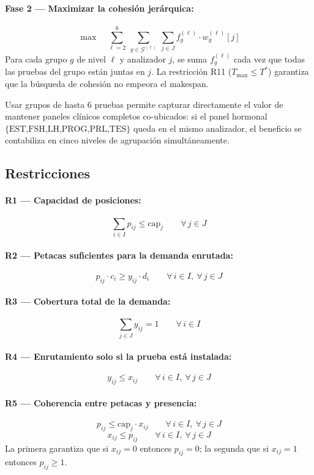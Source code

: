 \documentclass[12pt, a4paper]{article}
\begin{document}
\paragraph{Fase 2 — Maximizar la cohesión jerárquica:}
\[
  \max \quad \sum_{\ell=2}^{6}\ \sum_{g \in \mathcal{G}^{(\ell)}}\ \sum_{j \in J}
             f_g^{(\ell)} \cdot w_g^{(\ell)}[j]
\]
Para cada grupo $g$ de nivel $\ell$ y analizador $j$, se suma $f_g^{(\ell)}$ cada vez
que todas las pruebas del grupo están juntas en $j$. La restricción R11
($T_{\max} \leq T^*$) garantiza que la búsqueda de cohesión no empeora el makespan.

Usar grupos de hasta 6 pruebas permite capturar directamente el valor de mantener paneles
clínicos completos co-ubicados: si el panel hormonal $\{\text{EST,FSH,LH,PROG,PRL,TES}\}$
queda en el mismo analizador, el beneficio se contabiliza en cinco niveles de agrupación
simultáneamente.

\subsection{Restricciones}

\paragraph{R1 — Capacidad de posiciones:}
\[
  \sum_{i \in I} p_{ij} \leq \text{cap}_j \qquad \forall\, j \in J
\]

\paragraph{R2 — Petacas suficientes para la demanda enrutada:}
\[
  p_{ij} \cdot c_i \geq y_{ij} \cdot d_i \qquad \forall\, i \in I,\ \forall\, j \in J
\]

\paragraph{R3 — Cobertura total de la demanda:}
\[
  \sum_{j \in J} y_{ij} = 1 \qquad \forall\, i \in I
\]

\paragraph{R4 — Enrutamiento solo si la prueba está instalada:}
\[
  y_{ij} \leq x_{ij} \qquad \forall\, i \in I,\ \forall\, j \in J
\]

\paragraph{R5 — Coherencia entre petacas y presencia:}
\[
  p_{ij} \leq \text{cap}_j \cdot x_{ij} \qquad \forall\, i \in I,\ \forall\, j \in J
\]
\[
  x_{ij} \leq p_{ij} \qquad \forall\, i \in I,\ \forall\, j \in J
\]
La primera garantiza que si $x_{ij}=0$ entonces $p_{ij}=0$; la segunda que si
$x_{ij}=1$ entonces $p_{ij} \geq 1$.
\end{document}
